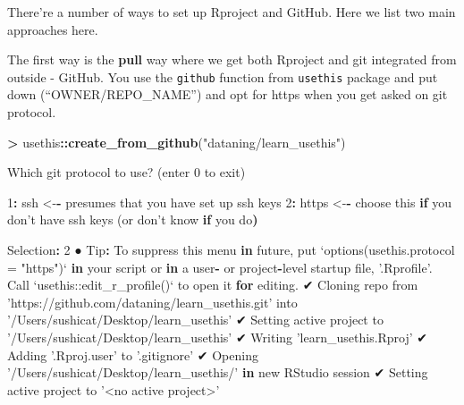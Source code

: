 \documentclass[]{book}
\newenvironment{Shaded}{\begin{snugshade}}{\end{snugshade}}
\newcommand{\ControlFlowTok}[1]{\textcolor[rgb]{0.13,0.29,0.53}{\textbf{#1}}}
\newcommand{\DataTypeTok}[1]{\textcolor[rgb]{0.13,0.29,0.53}{#1}}
\newcommand{\DecValTok}[1]{\textcolor[rgb]{0.00,0.00,0.81}{#1}}
\newcommand{\ErrorTok}[1]{\textcolor[rgb]{0.64,0.00,0.00}{\textbf{#1}}}
\newcommand{\KeywordTok}[1]{\textcolor[rgb]{0.13,0.29,0.53}{\textbf{#1}}}
\newcommand{\NormalTok}[1]{#1}
\newcommand{\OperatorTok}[1]{\textcolor[rgb]{0.81,0.36,0.00}{\textbf{#1}}}
\newcommand{\StringTok}[1]{\textcolor[rgb]{0.31,0.60,0.02}{#1}}
\begin{document}
There're a number of ways to set up Rproject and GitHub. Here we list two main approaches here.

The first way is the \textbf{pull} way where we get both Rproject and git integrated from outside - GitHub. You use the \texttt{github} function from \texttt{usethis} package and put down (``OWNER/REPO\_NAME'') and opt for https when you get asked on git protocol.

\begin{Shaded}
\begin{Highlighting}[]
\OperatorTok{>}\StringTok{ }\NormalTok{usethis}\OperatorTok{::}\KeywordTok{create_from_github}\NormalTok{(}\StringTok{"dataning/learn_usethis"}\NormalTok{)}

\NormalTok{Which git protocol to use? (enter }\DecValTok{0}\NormalTok{ to exit) }

\DecValTok{1}\OperatorTok{:}\StringTok{ }\NormalTok{ssh   <-}\OperatorTok{-}\StringTok{ }\NormalTok{presumes that you have set up ssh keys}
\DecValTok{2}\OperatorTok{:}\StringTok{ }\NormalTok{https <-}\OperatorTok{-}\StringTok{ }\NormalTok{choose this }\ControlFlowTok{if}\NormalTok{ you don}\StringTok{'t have ssh keys (or don'}\NormalTok{t know }\ControlFlowTok{if}\NormalTok{ you do}\ErrorTok{)}

\NormalTok{Selection}\OperatorTok{:}\StringTok{ }\DecValTok{2}
\NormalTok{● Tip}\OperatorTok{:}\StringTok{ }\NormalTok{To suppress this menu }\ControlFlowTok{in}\NormalTok{ future, put}
  \StringTok{`}\DataTypeTok{options(usethis.protocol = "https")}\StringTok{`}
  \ControlFlowTok{in}\NormalTok{ your script or }\ControlFlowTok{in}\NormalTok{ a user}\OperatorTok{-}\StringTok{ }\NormalTok{or project}\OperatorTok{-}\NormalTok{level startup file, }\StringTok{'.Rprofile'}\NormalTok{.}
\NormalTok{  Call }\StringTok{`}\DataTypeTok{usethis::edit_r_profile()}\StringTok{`}\NormalTok{ to open it }\ControlFlowTok{for}\NormalTok{ editing.}
\NormalTok{✔ Cloning repo from }\StringTok{'https://github.com/dataning/learn_usethis.git'}\NormalTok{ into }\StringTok{'/Users/sushicat/Desktop/learn_usethis'}
\NormalTok{✔ Setting active project to }\StringTok{'/Users/sushicat/Desktop/learn_usethis'}
\NormalTok{✔ Writing }\StringTok{'learn_usethis.Rproj'}
\NormalTok{✔ Adding }\StringTok{'.Rproj.user'}\NormalTok{ to }\StringTok{'.gitignore'}
\NormalTok{✔ Opening }\StringTok{'/Users/sushicat/Desktop/learn_usethis/'} \ControlFlowTok{in}\NormalTok{ new RStudio session}
\NormalTok{✔ Setting active project to }\StringTok{'<no active project>'}
\end{Highlighting}
\end{Shaded}
\end{document}
